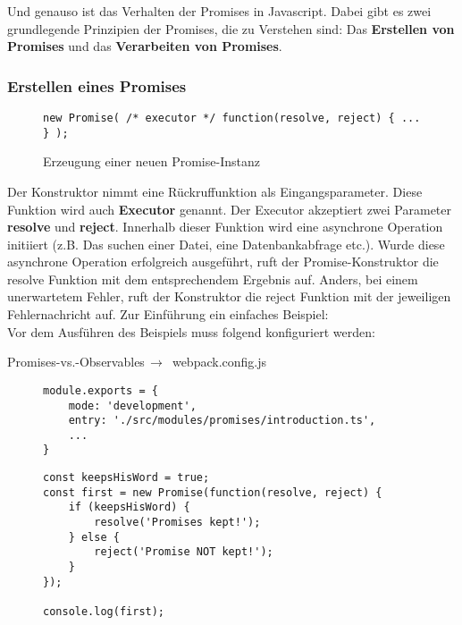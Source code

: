 \noindent
Und genauso ist das Verhalten der Promises in Javascript. Dabei gibt es zwei grundlegende Prinzipien der Promises, die zu Verstehen sind: Das \textbf{Erstellen von Promises} und das \textbf{Verarbeiten von Promises}.

\subsubsection{Erstellen eines Promises}

\begin{figure}[H]
\begin{lstlisting}
new Promise( /* executor */ function(resolve, reject) { ... } );
\end{lstlisting}
\caption{Erzeugung einer neuen Promise-Instanz}
\end{figure}

Der Konstruktor nimmt eine Rückruffunktion als Eingangsparameter. Diese Funktion wird auch \textbf{Executor} genannt.\cite{promise-executor} Der Executor akzeptiert zwei Parameter \textbf{resolve} und \textbf{reject}. Innerhalb dieser Funktion wird eine asynchrone Operation initiiert (z.B. Das suchen einer Datei, eine Datenbankabfrage etc.). Wurde diese asynchrone Operation erfolgreich ausgeführt, ruft der Promise-Konstruktor die resolve Funktion mit dem entsprechendem Ergebnis auf. Anders, bei einem unerwartetem Fehler, ruft der Konstruktor die reject Funktion mit der jeweiligen Fehlernachricht auf. Zur Einführung ein einfaches Beispiel:\\

\noindent
Vor dem Ausführen des Beispiels muss folgend konfiguriert werden:

 \begin{center}
     Promises-vs.-Observables$\,\to\,$ webpack.config.js
 \end{center}

\begin{figure}[H]
\begin{lstlisting}
module.exports = {
    mode: 'development',
    entry: './src/modules/promises/introduction.ts',
    ...
}
\end{lstlisting}
\end{figure}

\begin{figure}[H]
\begin{lstlisting}
const keepsHisWord = true;
const first = new Promise(function(resolve, reject) {
    if (keepsHisWord) {
        resolve('Promises kept!');
    } else {
        reject('Promise NOT kept!');
    }
});

console.log(first);
\end{lstlisting}
\end{figure}

